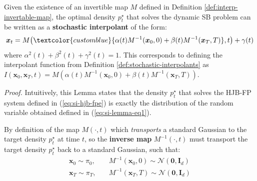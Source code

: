 \documentclass{article}
\newcommand{\bluetext}[1]{\textcolor{customblue}{#1}}
\begin{document}
\begin{lemma}\label{lemma:stochastic-interpolant-sb}
    Given the existence of an invertible map $M$ defined in Definition \ref{def:interp-invertable-map}, the optimal density $p_t^\star$ that solves the dynamic SB problem can be written as a \textbf{stochastic interpolant} of the form:
    \begin{align}
        \boldsymbol{x}_t=M\big(\bluetext{\alpha(t)M^{-1}(\boldsymbol{x}_0, 0 ) +\beta(t)M^{-1}(\boldsymbol{x}_T, T)},t\big)+\gamma(t)\label{eq:si-lemma-eq1}
    \end{align}
    where $\alpha^2(t)+\beta^2(t)+\gamma^2(t)=1$. This corresponds to defining the interpolant function from Definition \ref{def:stochastic-interpolants} as $I(\boldsymbol{x}_0, \boldsymbol{x}_T,t)=M(\alpha(t)M^{-1}(\boldsymbol{x}_0,0)+\beta(t)M^{-1}(\boldsymbol{x}_T,T))$.
\end{lemma}

\textit{Proof.} Intuitively, this Lemma states that the density $p_t^\star$ that solves the HJB-FP system defined in (\ref{eq:si-hjb-fpe}) is exactly the distribution of the random variable obtained defined in (\ref{eq:si-lemma-eq1}).

By definition of the map $M(\cdot, t)$ which \textit{transports} a standard Gaussian to the target density $p_t^\star$ at time $t$, so the \textbf{inverse map} $M^{-1}(\cdot, t)$ must transport the target density $p_t^\star$ back to a standard Gaussian, such that:
\begin{align}
    \boldsymbol{x}_0\sim \pi_0, \quad &M^{-1}(\boldsymbol{x}_0, 0)\sim \mathcal{N}(\boldsymbol{0}, \boldsymbol{I}_d)\\
    \boldsymbol{x}_T\sim \pi_T, \quad &M^{-1}(\boldsymbol{x}_T,T)\sim \mathcal{N}(\boldsymbol{0}, \boldsymbol{I}_d)
\end{align}
\end{document}
